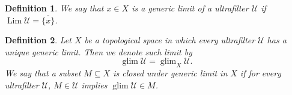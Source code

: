 \documentclass[8pt]{article}
\numberwithin{equation}{section}
\newtheorem{definition}{Definition}[subsection]
\DeclareMathOperator{\Lim}{Lim}
\DeclareMathOperator{\glim}{glim}
\newcommand{\U}[0]{\mathcal{U}}
\begin{document}
\begin{definition}
    \label{definition_11}
    We say that $x\in X$ is a generic limit of a ultrafilter $\U$ if $\Lim\U=\overline{\{x\}}$.
\end{definition}

\begin{definition}
    \label{definition_12}
    Let $X$ be a topological space in which every ultrafilter $\U$ has a unique generic limit. Then we denote such limit by
    \begin{equation*}
        \glim\U = \glim_X\U.
    \end{equation*}
    We say that a subset $M\subseteq X$ is closed under generic limit in $X$ if for every ultrafilter $\U$, $M\in\U$ implies $\glim\U\in M$.
\end{definition}
\end{document}
